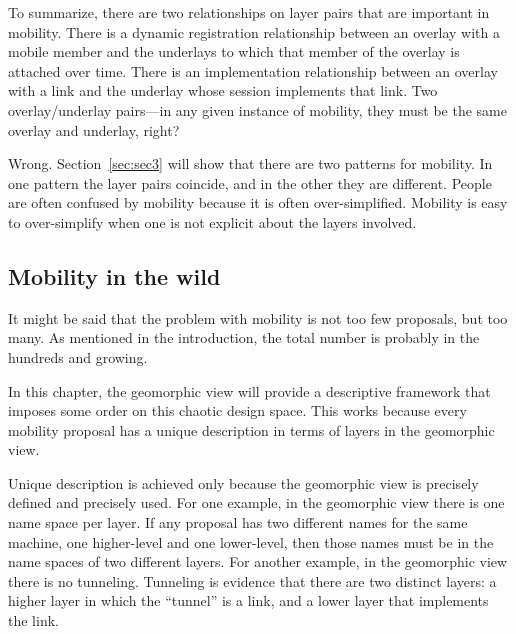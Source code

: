 To summarize, there are two relationships on layer pairs that are
important in mobility.
There is a dynamic
registration relationship between an overlay with a mobile member
and the
underlays to which that member of the overlay is attached over time.
There is an implementation relationship between an overlay with a link
and the underlay whose session implements that link.
Two overlay/underlay pairs---in any given instance of mobility, they
must be the same overlay and underlay, right?

Wrong.  
Section~\ref{sec:sec3} will show that there are two patterns for mobility.
In one pattern the layer pairs coincide, and in the other 
they are different.
People are often confused by mobility because it is often over-simplified.
Mobility is easy to over-simplify when one is not explicit about the
layers involved.

\subsection{Mobility in the wild}

It might be said that the problem with mobility is not too few proposals,
but too many.
As mentioned in the introduction, the
total number is probably in the hundreds and growing.

In this chapter, the geomorphic view will provide a descriptive 
framework that imposes some order on this chaotic design space.
This works because every mobility proposal has a unique description
in terms of layers in the geomorphic view.

Unique description is achieved only because the geomorphic view is
precisely defined and precisely used.
For one example, in the geomorphic view there is one name space per
layer.
If any proposal has two different names for the same machine,
one higher-level and one lower-level, then those names must be in
the name spaces of two different layers.
For another example, in the geomorphic view there is no tunneling.
Tunneling is evidence that there are two distinct layers: a higher
layer in which the ``tunnel'' is a link, and a lower layer that
implements the link.

